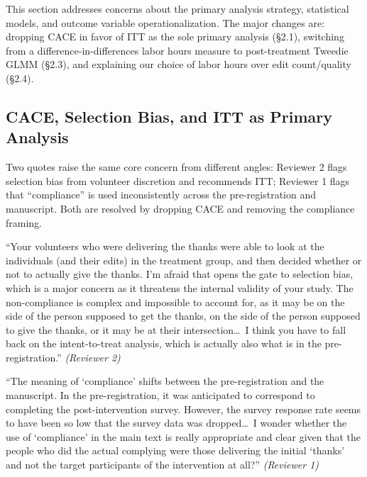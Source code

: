 \documentclass[12pt]{article}
\newenvironment{reviewquote}{%
  \def\FrameCommand{{\color{quotebarcolor}\vrule width 2pt}\colorbox{quotebg}}%
  \MakeFramed{\advance\hsize-\width \FrameRestore}%
  \small
}{%
  \endMakeFramed
}
\newcommand{\sectionnote}[1]{\par\smallskip#1\par\medskip}
\begin{document}
This section addresses concerns about the primary analysis strategy, statistical models, and outcome variable operationalization. The major changes are: dropping CACE in favor of ITT as the sole primary analysis (\S2.1), switching from a difference-in-differences labor hours measure to post-treatment Tweedie GLMM (\S2.3), and explaining our choice of labor hours over edit count/quality (\S2.4).

\subsection{CACE, Selection Bias, and ITT as Primary Analysis}

\sectionnote{Two quotes raise the same core concern from different angles: Reviewer 2 flags selection bias from volunteer discretion and recommends ITT; Reviewer 1 flags that ``compliance'' is used inconsistently across the pre-registration and manuscript. Both are resolved by dropping CACE and removing the compliance framing.}

\begin{reviewquote}
``Your volunteers who were delivering the thanks were able to look at the individuals (and their edits) in the treatment group, and then decided whether or not to actually give the thanks. I'm afraid that opens the gate to selection bias, which is a major concern as it threatens the internal validity of your study. The non-compliance is complex and impossible to account for, as it may be on the side of the person supposed to get the thanks, on the side of the person supposed to give the thanks, or it may be at their intersection\ldots\ I think you have to fall back on the intent-to-treat analysis, which is actually also what is in the pre-registration.'' \textit{(Reviewer 2)}
\end{reviewquote}

\begin{reviewquote}
``The meaning of `compliance' shifts between the pre-registration and the manuscript. In the pre-registration, it was anticipated to correspond to completing the post-intervention survey. However, the survey response rate seems to have been so low that the survey data was dropped\ldots\ I wonder whether the use of `compliance' in the main text is really appropriate and clear given that the people who did the actual complying were those delivering the initial `thanks' and not the target participants of the intervention at all?'' \textit{(Reviewer 1)}
\end{reviewquote}
\end{document}
